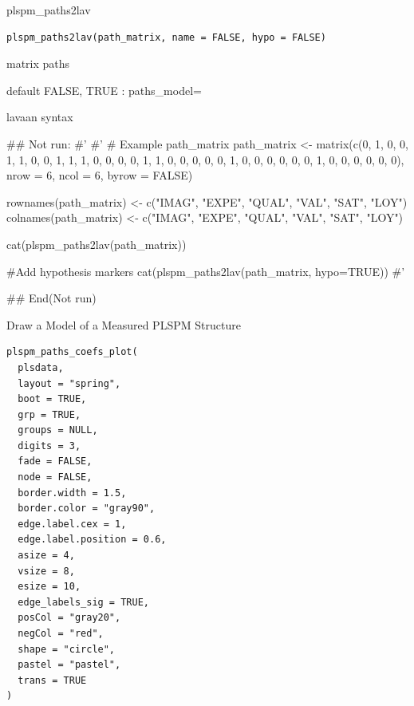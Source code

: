 \documentclass[a4paper]{book}
\begin{document}
%
\begin{Description}
plspm\_paths2lav
\end{Description}
%
\begin{Usage}
\begin{verbatim}
plspm_paths2lav(path_matrix, name = FALSE, hypo = FALSE)
\end{verbatim}
\end{Usage}
%
\begin{Arguments}
\begin{ldescription}
\item[\code{path\_matrix}] matrix paths

\item[\code{name}] default FALSE, TRUE : paths\_model=
\end{ldescription}
\end{Arguments}
%
\begin{Value}
lavaan syntax
\end{Value}
%
\begin{Examples}
\begin{ExampleCode}
\#\# Not run: 
#'
#' # Example path_matrix
path_matrix <- matrix(c(0, 1, 0, 0, 1, 1,
                        0, 0, 1, 1, 1, 0,
                        0, 0, 0, 1, 1, 0,
                        0, 0, 0, 0, 1, 0,
                        0, 0, 0, 0, 0, 1,
                        0, 0, 0, 0, 0, 0),
                      nrow = 6, ncol = 6, byrow = FALSE)

rownames(path_matrix) <- c("IMAG", "EXPE", "QUAL", "VAL", "SAT", "LOY")
colnames(path_matrix) <- c("IMAG", "EXPE", "QUAL", "VAL", "SAT", "LOY")

cat(plspm_paths2lav(path_matrix))

#Add hypothesis markers
cat(plspm_paths2lav(path_matrix, hypo=TRUE))
#'

## End(Not run)
\end{ExampleCode}
\end{Examples}
%
\begin{Description}
Draw a Model of a Measured PLSPM Structure
\end{Description}
%
\begin{Usage}
\begin{verbatim}
plspm_paths_coefs_plot(
  plsdata,
  layout = "spring",
  boot = TRUE,
  grp = TRUE,
  groups = NULL,
  digits = 3,
  fade = FALSE,
  node = FALSE,
  border.width = 1.5,
  border.color = "gray90",
  edge.label.cex = 1,
  edge.label.position = 0.6,
  asize = 4,
  vsize = 8,
  esize = 10,
  edge_labels_sig = TRUE,
  posCol = "gray20",
  negCol = "red",
  shape = "circle",
  pastel = "pastel",
  trans = TRUE
)
\end{verbatim}
\end{Usage}
\end{document}
